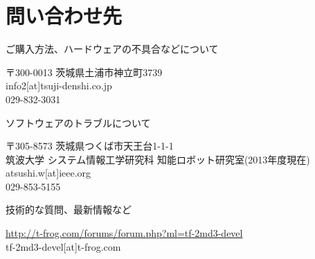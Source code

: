 \documentclass[11pt,a4j,openany,fleqn]{jbook}
\begin{document}
\newpage
\section{問い合わせ先}
\label{sec:問い合わせ先}

\begin{itembox}[l]
	{ご購入方法、ハードウェアの不具合などについて}
	{
		\hspace{1em}{\bf ツジ電子株式会社}\par
		\medskip\hspace{2em}
		\parbox[H]{0.8\textwidth}{
			〒300-0013 茨城県土浦市神立町3739\\
			info2[at]tsuji-denshi.co.jp\\
			029-832-3031
		}
	}
\end{itembox}
\vspace{1em}
\begin{itembox}[l]
	{ソフトウェアのトラブルについて}
	{
		\hspace{1em}{\bf 渡辺敦志}\par
		\medskip\hspace{2em}
		\parbox[H]{0.8\textwidth}{
			〒305-8573 茨城県つくば市天王台1-1-1\\
			筑波大学 システム情報工学研究科 知能ロボット研究室(2013年度現在)\\
			atsushi.w[at]ieee.org\\
			029-853-5155
		}
	}
\end{itembox}
\vspace{1em}
\begin{itembox}[l]
	{技術的な質問、最新情報など}
	{
		\hspace{1em}{\bf T-frog プロジェクト モータドライバフォーラム (メーリングリスト)}\par
		\medskip\hspace{2em}
		\parbox[H]{0.8\textwidth}{
			\url{http://t-frog.com/forums/forum.php?ml=tf-2md3-devel}\\
			tf-2md3-devel[at]t-frog.com
		}
	}
\end{itembox}
\end{document}
